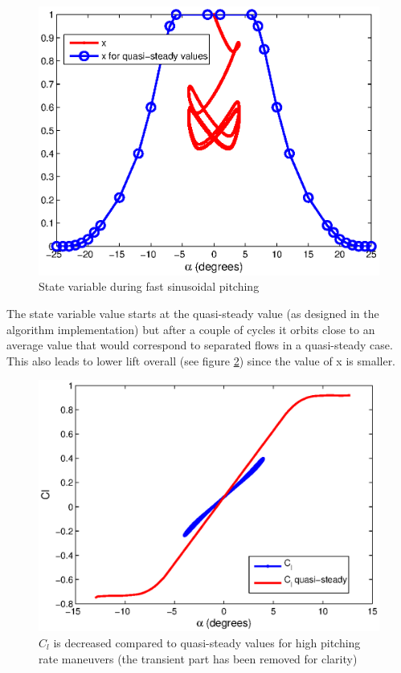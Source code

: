 \begin{figure}[h]
  \centering
  \includegraphics{./Figures/x_sin_amp=4_k=0p5.eps}
  \caption{State variable during fast sinusoidal pitching}
  \label{fig:x_fast_pitching}
\end{figure}

\par The state variable value starts at the quasi-steady value (as designed in the algorithm implementation) but after a couple of cycles it orbits close to an average value that would correspond to separated flows in a quasi-steady case.
This also leads to lower lift overall (see figure \ref{fig:Cl_fast_pitching}) since the value of x is smaller.

\begin{figure}[h]
  \centering
  \includegraphics{./Figures/Cl_vs_alpha_amp=4_k=0p5.eps}
  \caption{$C_l$ is decreased compared to quasi-steady values for high pitching rate maneuvers (the transient part has been removed for clarity)}
  \label{fig:Cl_fast_pitching}
\end{figure}

